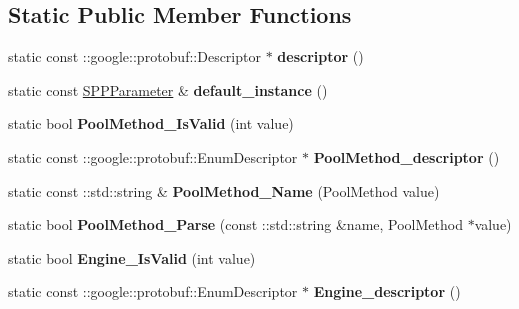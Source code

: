 \subsection*{Static Public Member Functions}
\begin{DoxyCompactItemize}
\item 
\mbox{\label{classcaffe_1_1_s_p_p_parameter_a944b41008f2840fee827dc7f2a6ff7d4}} 
static const \+::google\+::protobuf\+::\+Descriptor $\ast$ {\bfseries descriptor} ()
\item 
\mbox{\label{classcaffe_1_1_s_p_p_parameter_a580bfac8860f73983b5ae7b81200cb2f}} 
static const \mbox{\hyperlink{classcaffe_1_1_s_p_p_parameter}{S\+P\+P\+Parameter}} \& {\bfseries default\+\_\+instance} ()
\item 
\mbox{\label{classcaffe_1_1_s_p_p_parameter_a419ee653304448688b4083acbe24c1ed}} 
static bool {\bfseries Pool\+Method\+\_\+\+Is\+Valid} (int value)
\item 
\mbox{\label{classcaffe_1_1_s_p_p_parameter_a32091c4517f26d2fadd8cf3c6e4b2dc7}} 
static const \+::google\+::protobuf\+::\+Enum\+Descriptor $\ast$ {\bfseries Pool\+Method\+\_\+descriptor} ()
\item 
\mbox{\label{classcaffe_1_1_s_p_p_parameter_a99d331ad14dd1fcc76c480e4becb3059}} 
static const \+::std\+::string \& {\bfseries Pool\+Method\+\_\+\+Name} (Pool\+Method value)
\item 
\mbox{\label{classcaffe_1_1_s_p_p_parameter_a438e4a3d2e709e467c41b9e35c7a6986}} 
static bool {\bfseries Pool\+Method\+\_\+\+Parse} (const \+::std\+::string \&name, Pool\+Method $\ast$value)
\item 
\mbox{\label{classcaffe_1_1_s_p_p_parameter_a908e88b1a56df1e26deb4726c293a1ed}} 
static bool {\bfseries Engine\+\_\+\+Is\+Valid} (int value)
\item 
\mbox{\label{classcaffe_1_1_s_p_p_parameter_a74d15bac867a7507d0e752439fb27108}} 
static const \+::google\+::protobuf\+::\+Enum\+Descriptor $\ast$ {\bfseries Engine\+\_\+descriptor} ()

\end{DoxyCompactItemize}

